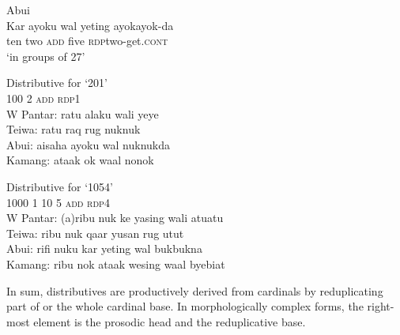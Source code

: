 \ea%
\label{bkm:Ref342661452}
{\upshape Abui}\\
\gll Kar   ayoku   wal   yeting   ayok{\Tilde}ayok-da\\  
   ten   two   \textsc{add}   five   \textsc{rdp}\textit{{\Tilde}}two-get.\textsc{cont} \\
\glt  `in groups of 27' 
\z
 



\let\eachwordone=\upshape
\let\eachwordtwo=\itshape 
\let\eachwordthree=\itshape 
\let\eachwordfour=\itshape 
\let\eachwordfive=\itshape 

\ea%
\label{bkm:Ref342656299} 
{\upshape Distributive for `201'} \\
\glllll  {} 100    2    \textsc{add}    \textsc{rdp}{\Tilde}1\\  
 {\upshape W Pantar:} ratu    alaku    wali     ye{\Tilde}ye        \\
 {\upshape Teiwa:}    ratu    raq    rug    nuk{\Tilde}nuk      \\
 {\upshape Abui:}     aisaha     ayoku    wal    nuk{\Tilde}nukda      \\
 {\upshape Kamang:}   ataak     ok     waal    no{\Tilde}nok     \\  
\z

\ea%
\label{bkm:Ref342744393}
 
{\upshape Distributive for `1054'}\\
\glllll   {}   1000    1  10  5    \textsc{add}  \textsc{rdp}{\Tilde}4 \\      
   {\upshape W Pantar:}  (a)ribu   nuk   ke  yasing     wali  atu{\Tilde}atu    \\
   {\upshape Teiwa:}    ribu     nuk  qaar  yusan    rug  ut{\Tilde}ut    \\
   {\upshape Abui:}     rifi    nuku  kar  yeting    wal  buk{\Tilde}bukna      \\
   {\upshape Kamang:}   ribu    nok  ataak  wesing    waal  bye{\Tilde}biat     \\
\z


\let\eachwordone=\itshape
\let\eachwordtwo=\upshape 
\let\eachwordthree=\upshape 
\let\eachwordfour=\upshape 
\let\eachwordfive=\upshape 
    

In sum, distributives are productively derived from cardinals by reduplicating part of or the whole cardinal base. In morphologically complex forms, the right-most element is the prosodic head and the reduplicative base. 

